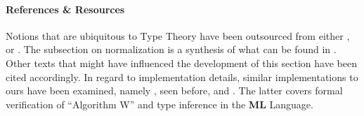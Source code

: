 \paragraph{References \& Resources}{Notions that are ubiquitous to Type Theory have been outsourced from either \cite{nederpelt2014:type-theory}, \cite{selinger2008:lambdanotes} or \cite{sorensen2006:curry-howard}. The subsection on normalization is a synthesis of what can be found in \cite{girard1989:proofs-and-types}. Other texts that might have influenced the development of this section have been cited accordingly. In regard to implementation details, similar implementations to ours have been examined, namely \cite{NazarethNipkow1996AlgorithmW}, seen before, and \cite{Ahmed2012TypeInference}. The latter covers formal verification of ``Algorithm W'' and type inference in the \textbf{ML} Language.
}





